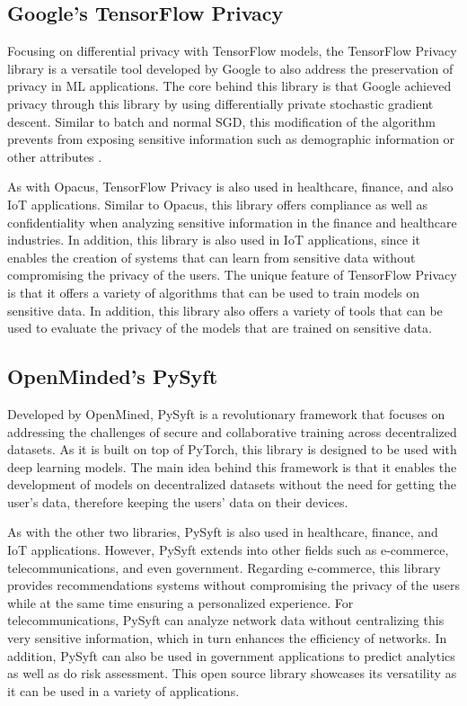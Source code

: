 \documentclass[conference]{IEEEtran}
\begin{document}
\subsection{Google's TensorFlow Privacy}

Focusing on differential privacy with TensorFlow models, the TensorFlow Privacy
library is a versatile tool developed by Google to also address the preservation
of privacy in ML applications. The core behind this library is that Google
achieved privacy through this library by using differentially private
stochastic gradient descent. Similar to batch and normal SGD, this modification
of the algorithm prevents from exposing sensitive information such as
demographic information or other attributes \cite{b2}. 

As with Opacus, TensorFlow Privacy is also used in healthcare, finance, and 
also IoT applications. Similar to Opacus, this library offers compliance as well
as confidentiality when analyzing sensitive information in the finance and
healthcare industries. In addition, this library is also used in IoT
applications, since it enables the creation of systems that can learn from
sensitive data without compromising the privacy of the users. The unique
feature of TensorFlow Privacy is that it offers a variety of algorithms that
can be used to train models on sensitive data. In addition, this library also
offers a variety of tools that can be used to evaluate the privacy of the
models that are trained on sensitive data.

\subsection{OpenMinded's PySyft}

Developed by OpenMined, PySyft is a revolutionary framework that focuses on
addressing the challenges of secure and collaborative training across
decentralized datasets. As it is built on top of PyTorch, this library is
designed to be used with deep learning models. The main idea behind this
framework is that it enables the development of models on decentralized
datasets without the need for getting the user's data\cite{b3}, therefore keeping the
users' data on their devices.

As with the other two libraries, PySyft is also used in healthcare, finance,
and IoT applications. However, PySyft extends into other fields such as
e-commerce, telecommunications, and even government. Regarding e-commerce,
this library provides recommendations systems without compromising the privacy
of the users while at the same time ensuring a personalized experience. For
telecommunications, PySyft can analyze network data without centralizing
this very sensitive information, which in turn enhances the efficiency of
networks. In addition, PySyft can also be used in government applications to
predict analytics as well as do risk assessment. This open source library
showcases its versatility as it can be used in a variety of applications.
\end{document}
